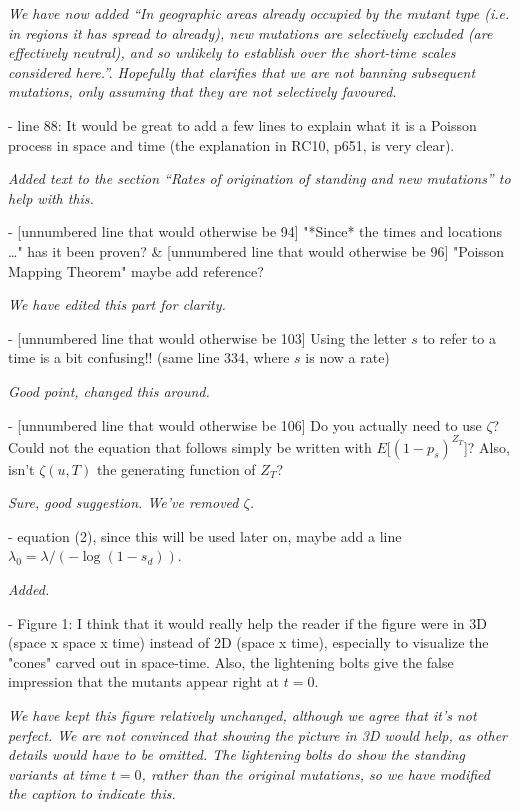 \documentclass[12pt,letterpaper]{article}
\newcommand{\response}[1]{\emph{ \color{blue} #1}}
\begin{document}
\response{We have now added ``In geographic areas already
 occupied by the mutant type (i.e. in regions it has spread to already), new mutations are selectively excluded
 (are effectively neutral), and so unlikely to establish over the
 short-time scales considered here.''. Hopefully that clarifies that we are not banning subsequent mutations, only assuming that they are not selectively favoured.}

- line 88: It would be great to add a few lines to explain what it is a Poisson process in space and time (the explanation in RC10, p651, is very clear).

\response{Added text to the section ``Rates of origination of standing and new mutations'' to help with this.} 

- [unnumbered line that would otherwise be 94] "*Since* the times and locations \ldots" has it been proven? \& [unnumbered line that would otherwise be 96] "Poisson Mapping Theorem" maybe add reference?

\response{We have edited this part for clarity.}


- [unnumbered line that would otherwise be 103] Using the letter $s$ to refer to a time is a bit confusing!!
(same line 334, where $s$ is now a rate)

\response{Good point, changed this around.}

- [unnumbered line that would otherwise be 106] Do you actually need to use $\zeta$? Could not the equation that follows simply be written with $E[(1-p_s)^{Z_T}$]? Also, isn't $\zeta(u,T)$ the generating function of $Z_T$?

\response{Sure, good suggestion.  We've removed $\zeta$.}

- equation (2), since this will be used later on, maybe add a line $\lambda_0 = \lambda / (-\log(1-s_d))$.

\response{Added.}

- Figure 1: I think that it would really help the reader if the figure were in 3D (space x space x time) instead of 2D (space x time), especially to visualize the "cones" carved out in space-time. Also, the lightening bolts give the false impression that the mutants appear right at $t=0$.

\response{We have kept this figure relatively unchanged, although we agree that it's not perfect. We are not convinced that showing the picture in 3D would help, as other details would have to be omitted. The lightening bolts do show the standing variants at time $t=0$, rather than the original mutations, so we have modified the caption to indicate this.}
\end{document}
